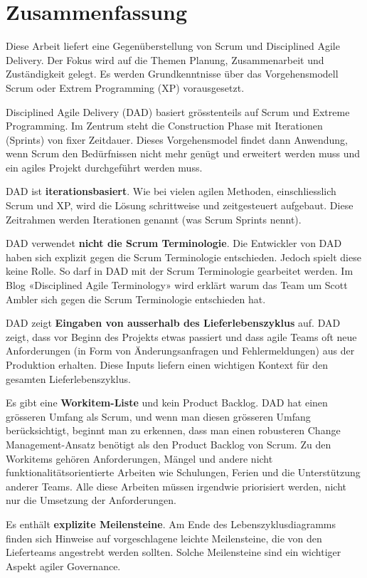 \chapter*{Zusammenfassung}
\thispagestyle{fancy}

Diese Arbeit liefert eine Gegenüberstellung von Scrum und Disciplined Agile Delivery. Der Fokus wird auf die Themen Planung, Zusammenarbeit und Zuständigkeit gelegt. Es werden Grundkenntnisse über das Vorgehensmodell Scrum oder Extrem Programming (XP) vorausgesetzt.

Disciplined Agile Delivery (DAD) basiert grösstenteils auf Scrum und Extreme Programming. Im Zentrum steht die Construction Phase mit Iterationen (Sprints) von fixer Zeitdauer. Dieses Vorgehensmodel findet dann Anwendung, wenn Scrum den Bedürfnissen nicht mehr genügt und erweitert werden muss und ein agiles Projekt durchgeführt werden muss.

DAD ist \textbf{iterationsbasiert}. Wie bei vielen agilen Methoden, einschliesslich Scrum und XP, wird die Lösung schrittweise und zeitgesteuert aufgebaut. Diese Zeitrahmen werden Iterationen genannt (was Scrum Sprints nennt).

DAD verwendet \textbf{nicht die Scrum Terminologie}. Die Entwickler von DAD haben sich explizit gegen die Scrum Terminologie entschieden. Jedoch spielt diese keine Rolle. So darf in DAD mit der Scrum Terminologie gearbeitet werden. Im Blog «Disciplined Agile Terminology»\cite{blogTerminology} wird erklärt warum das Team um Scott Ambler sich gegen die Scrum Terminologie entschieden hat.

DAD zeigt \textbf{Eingaben von ausserhalb des Lieferlebenszyklus} auf. DAD zeigt, dass vor Beginn des Projekts etwas passiert und dass agile Teams oft neue Anforderungen (in Form von Änderungsanfragen und Fehlermeldungen) aus der Produktion erhalten. Diese Inputs liefern einen wichtigen Kontext für den gesamten Lieferlebenszyklus.

Es gibt eine \textbf{Workitem-Liste} und kein Product Backlog. DAD hat einen grösseren Umfang als Scrum, und wenn man diesen grösseren Umfang berücksichtigt, beginnt man zu erkennen, dass man einen robusteren Change Management-Ansatz benötigt als den Product Backlog von Scrum. Zu den Workitems gehören Anforderungen, Mängel und andere nicht funktionalitätsorientierte Arbeiten wie Schulungen, Ferien und die Unterstützung anderer Teams. Alle diese Arbeiten müssen irgendwie priorisiert werden, nicht nur die Umsetzung der Anforderungen.

Es enthält \textbf{explizite Meilensteine}. Am Ende des Lebenszyklusdiagramms finden sich Hinweise auf vorgeschlagene leichte Meilensteine, die von den Lieferteams angestrebt werden sollten. Solche Meilensteine sind ein wichtiger Aspekt agiler Governance.

